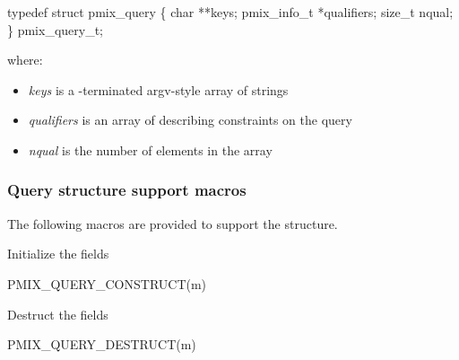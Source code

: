 \cspecificstart
\begin{codepar}
typedef struct pmix_query \{
    char **keys;
    pmix_info_t *qualifiers;
    size_t nqual;
\} pmix_query_t;
\end{codepar}
\cspecificend

where:

\begin{itemize}
    \item \emph{keys} is a -terminated argv-style array of strings
    \item \emph{qualifiers} is an array of  describing constraints on the query
    \item \emph{nqual} is the number of elements in the  array
\end{itemize}

\subsubsection{Query structure support macros}
The following macros are provided to support the  structure.


Initialize the  fields

\cspecificstart
\begin{codepar}
PMIX_QUERY_CONSTRUCT(m)
\end{codepar}
\cspecificend

\begin{arglist}
\end{arglist}


Destruct the  fields

\cspecificstart
\begin{codepar}
PMIX_QUERY_DESTRUCT(m)
\end{codepar}
\cspecificend

\begin{arglist}
\end{arglist}

